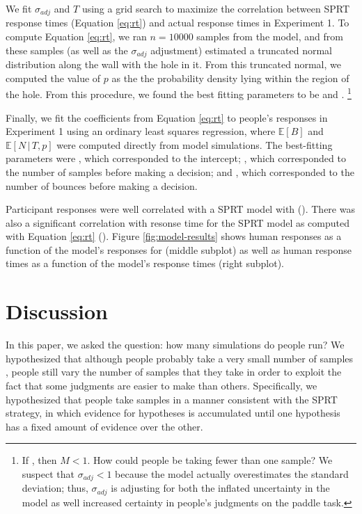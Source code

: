 \documentclass[10pt,letterpaper]{article}
\begin{document}
We fit $\sigma_{adj}$ and $T$ using a grid search to maximize the correlation between SPRT response times (Equation \ref{eq:rt}) and actual response times in Experiment 1.
To compute Equation \ref{eq:rt}, we ran $n=10000$ samples from the model, and from these samples (as well as the $\sigma_{adj}$ adjustment) estimated a truncated normal distribution along the wall with the hole in it.
From this truncated normal, we computed the value of $p$ as the the probability density lying within the region of the hole.
From this procedure, we found the best fitting parameters to be \sdadj{} and \threshold{}.
\footnote{If \sdadj{}, then $M<1$. How could people be taking fewer than one sample?
We suspect that $\sigma_{adj}<1$ because the model actually overestimates the standard deviation; thus, $\sigma_{adj}$ is adjusting for both the inflated uncertainty in the model as well increased certainty in people's judgments on the paddle task.}

Finally, we fit the coefficients from Equation \ref{eq:rt} to people's responses in Experiment 1 using an ordinary least squares regression, where $\mathbb{E}[B]$ and $\mathbb{E}[N\,|\,T,p]$ were computed directly from model simulations. 
The best-fitting parameters were \betazero{}, which corresponded to the intercept; \betaone{}, which corresponded to the number of samples before making a decision; and \betatwo{}, which corresponded to the number of bounces before making a decision.

Participant responses were well correlated with a SPRT model with \threshold{} (\HoleResponseCorr{}).
There was also a significant correlation with resonse time for the \threshold{} SPRT model as computed with Equation \ref{eq:rt} (\HoleRTCorr{}).
Figure \ref{fig:model-results} shows human responses as a function of the model's responses for \threshold{} (middle subplot) as well as human response times as a function of the model's response times (right subplot).

\section{Discussion}

In this paper, we asked the question: how many simulations do people run?
We hypothesized that although people probably take a very small number of samples \cite{Vul:2014ba}, people still vary the number of samples that they take in order to exploit the fact that some judgments are easier to make than others.
Specifically, we hypothesized that people take samples in a manner consistent with the SPRT strategy, in which evidence for hypotheses is accumulated until one hypothesis has a fixed amount of evidence over the other.
\end{document}

